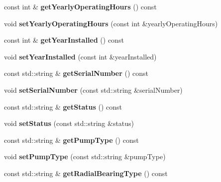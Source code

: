 \begin{DoxyCompactItemize}
const int \& {\bfseries get\+Yearly\+Operating\+Hours} () const
\item 
\mbox{\label{class_pump_data_a9ab818690858c618efeb8646b9095498}} 
void {\bfseries set\+Yearly\+Operating\+Hours} (const int \&yearly\+Operating\+Hours)
\item 
\mbox{\label{class_pump_data_a5e8181382817204accaf3f4d43de4ab8}} 
const int \& {\bfseries get\+Year\+Installed} () const
\item 
\mbox{\label{class_pump_data_ae8b9757c60ce5d6bbc1b269f45205e16}} 
void {\bfseries set\+Year\+Installed} (const int \&year\+Installed)
\item 
\mbox{\label{class_pump_data_a45e0e25c731098a6aaa0f14bd9b920e0}} 
const std\+::string \& {\bfseries get\+Serial\+Number} () const
\item 
\mbox{\label{class_pump_data_ac4dc6abcf6f6efc11ff1499d3e59d1e5}} 
void {\bfseries set\+Serial\+Number} (const std\+::string \&serial\+Number)
\item 
\mbox{\label{class_pump_data_a9448bd591a05c011fe396a2c54d4ecef}} 
const std\+::string \& {\bfseries get\+Status} () const
\item 
\mbox{\label{class_pump_data_a0e4ac6c9e8440b66d5c02d7a592e93f5}} 
void {\bfseries set\+Status} (const std\+::string \&status)
\item 
\mbox{\label{class_pump_data_a9df0381a59753f914ccfacedbd939c93}} 
const std\+::string \& {\bfseries get\+Pump\+Type} () const
\item 
\mbox{\label{class_pump_data_a686c299f2540e968b3a9734ebb700fa0}} 
void {\bfseries set\+Pump\+Type} (const std\+::string \&pump\+Type)
\item 
\mbox{\label{class_pump_data_ab172e5afd816a2dd580f91cb89896ae6}} 
const std\+::string \& {\bfseries get\+Radial\+Bearing\+Type} () const
\item 
\mbox{\label{class_pump_data_aca98c7dbba6fd67e02cf7b5088c5f9ed}} 

\end{DoxyCompactItemize}

